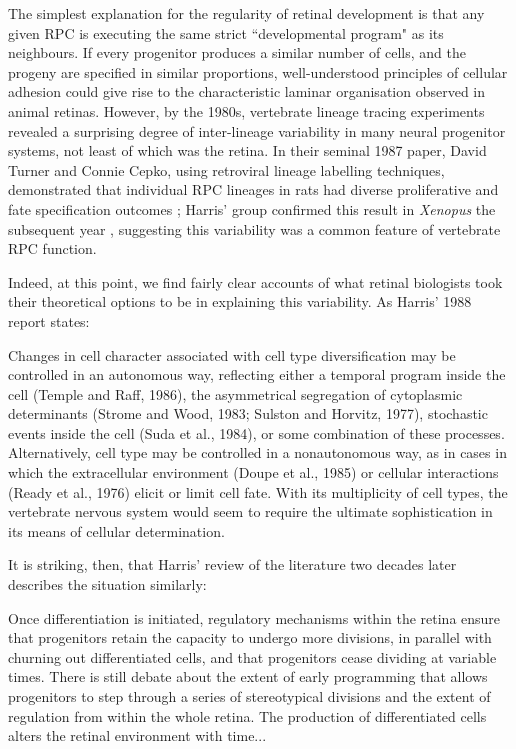 \documentclass{ut-thesis}
\begin{document}
\begin{NoHyper}
The simplest explanation for the regularity of retinal development is that any given RPC is executing the same strict ``developmental program" as its neighbours. If every progenitor produces a similar number of cells, and the progeny are specified in similar proportions, well-understood principles of cellular adhesion could give rise to the characteristic laminar organisation observed in animal retinas. However, by the 1980s, vertebrate lineage tracing experiments revealed a surprising degree of inter-lineage variability in many neural progenitor systems, not least of which was the retina. In their seminal 1987 paper, David Turner and Connie Cepko, using retroviral lineage labelling techniques, demonstrated that individual RPC lineages in rats had diverse proliferative and fate specification outcomes \cite{Turner1987}; Harris' group confirmed this result in \textit{Xenopus} the subsequent year \cite{Holt1988}, suggesting this variability was a common feature of vertebrate RPC function.

Indeed, at this point, we find fairly clear accounts of what retinal biologists took their theoretical options to be in explaining this variability. As Harris' 1988 report states:

\begin{longquote}
Changes in cell character associated with cell type diversification may be controlled in an autonomous way, reflecting either a temporal program inside the cell (Temple and Raff, 1986), the asymmetrical segregation of cytoplasmic determinants (Strome and Wood,
1983; Sulston and Horvitz, 1977), stochastic events inside the cell (Suda et al., 1984), or some combination of
these processes. Alternatively, cell type may be controlled in a nonautonomous way, as in cases in which
the extracellular environment (Doupe et al., 1985) or
cellular interactions (Ready et al., 1976) elicit or limit cell
fate. With its multiplicity of cell types, the vertebrate nervous system would seem to require the ultimate sophistication in its means of cellular determination. 
\cite{Holt1988}
\end{longquote}

It is striking, then, that Harris' review of the literature two decades later describes the situation similarly:

\begin{longquote}
Once differentiation is initiated, regulatory
mechanisms within the retina ensure that progenitors retain the capacity to undergo more
divisions, in parallel with churning out differentiated cells, and that progenitors cease dividing at variable times. There is still debate
about the extent of early programming that allows progenitors to step through a series of
stereotypical divisions and the extent of regulation from within the whole retina. The production of differentiated cells alters the retinal
environment with time...


\end{longquote}
\end{NoHyper}
\end{document}
